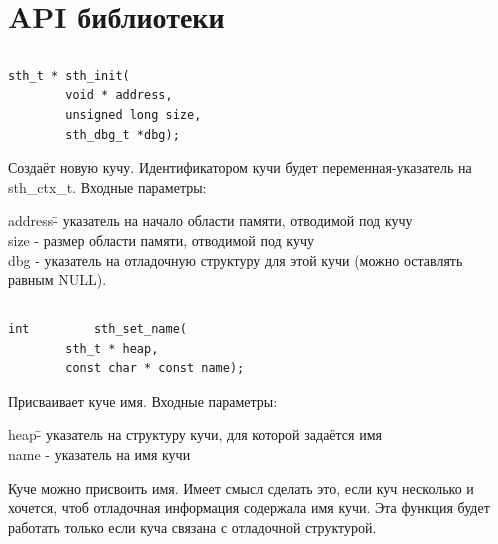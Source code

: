 \documentclass{article}
\begin{document}
\newpage
\section{API библиотеки}
\subsection*{}
\begin{lstlisting}
sth_t * sth_init(
        void * address, 
        unsigned long size, 
        sth_dbg_t *dbg);
\end{lstlisting}
Создаёт новую кучу. Идентификатором кучи будет переменная-указатель на sth\_ctx\_t.
Входные параметры:
\begin{tabbing}
address\quad\= - указатель на начало области памяти, отводимой под кучу\\ 
size \>        - размер области памяти, отводимой под кучу\\
dbg \>         - указатель на отладочную структуру для этой кучи (можно оставлять равным NULL).
\end{tabbing}

\subsection*{}
\begin{lstlisting}
int         sth_set_name(
        sth_t * heap, 
        const char * const name);
\end{lstlisting}
Присваивает куче имя.
Входные параметры:
\begin{tabbing}
heap\quad\=    - указатель на структуру кучи, для которой задаётся имя\\ 
name \>        - указатель на имя кучи
\end{tabbing}
Куче можно присвоить имя. Имеет смысл сделать это, если куч несколько и хочется, чтоб отладочная информация содержала имя кучи. Эта функция будет работать только если куча связана с отладочной структурой.
\end{document}
